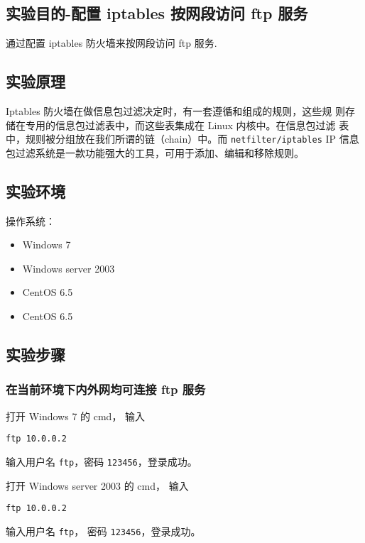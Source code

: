 \subsection{实验目的-配置 iptables 按网段访问 ftp 服务}
通过配置 iptables 防火墙来按网段访问 ftp 服务.
%
\subsection{实验原理}
Iptables 防火墙在做信息包过滤决定时，有一套遵循和组成的规则，这些规
则存储在专用的信息包过滤表中，而这些表集成在 Linux 内核中。在信息包过滤
表中，规则被分组放在我们所谓的链（chain）中。而 \texttt{netfilter/iptables} IP
信息包过滤系统是一款功能强大的工具，可用于添加、编辑和移除规则。
%
\subsection{实验环境}
操作系统：
\begin{itemize}
  \item Windows 7
  \item Windows server 2003
  \item CentOS 6.5
  \item CentOS 6.5
\end{itemize}
%
\subsection{实验步骤}
\subsubsection{在当前环境下内外网均可连接 ftp 服务}
打开 Windows 7 的 cmd，
输入
\begin{verbatim}
ftp 10.0.0.2
\end{verbatim}
输入用户名 \texttt{ftp}，密码 \texttt{123456}，登录成功。

打开 Windows server 2003 的 cmd，
输入
\begin{verbatim}
ftp 10.0.0.2
\end{verbatim}
输入用户名 \texttt{ftp}，
密码 \texttt{123456}，登录成功。
%

